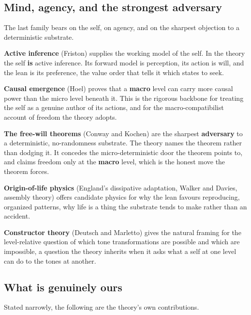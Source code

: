 \subsection{Mind, agency, and the strongest adversary}

The last family bears on the self, on agency, and on the sharpest objection to a deterministic substrate.

\textbf{Active inference} (Friston) supplies the working model of the self. In the theory the self \textbf{is} active inference. Its forward model is perception, its action is will, and the lean is its preference, the value order that tells it which states to seek.

\textbf{Causal emergence} (Hoel) proves that a \textbf{macro} level can carry more causal power than the micro level beneath it. This is the rigorous backbone for treating the self as a genuine author of its actions, and for the macro-compatibilist account of freedom the theory adopts.

\textbf{The free-will theorems} (Conway and Kochen) are the sharpest \textbf{adversary} to a deterministic, no-randomness substrate. The theory names the theorem rather than dodging it. It concedes the micro-deterministic door the theorem points to, and claims freedom only at the \textbf{macro} level, which is the honest move the theorem forces.

\textbf{Origin-of-life physics} (England's dissipative adaptation, Walker and Davies, assembly theory) offers candidate physics for why the lean favours reproducing, organized patterns, why life is a thing the substrate tends to make rather than an accident.

\textbf{Constructor theory} (Deutsch and Marletto) gives the natural framing for the level-relative question of which tone transformations are possible and which are impossible, a question the theory inherits when it asks what a self at one level can do to the tones at another.

\subsection{What is genuinely ours}

Stated narrowly, the following are the theory's own contributions.

